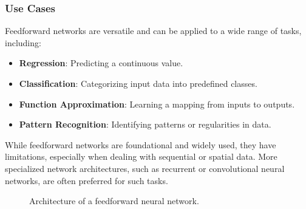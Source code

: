 \subsubsection{Use Cases}

Feedforward networks are versatile and can be applied to a wide range of tasks, including:
\begin{itemize}
    \item \textbf{Regression}: Predicting a continuous value.
    \item \textbf{Classification}: Categorizing input data into predefined classes.
    \item \textbf{Function Approximation}: Learning a mapping from inputs to outputs.
    \item \textbf{Pattern Recognition}: Identifying patterns or regularities in data.
\end{itemize}

While feedforward networks are foundational and widely used, they have limitations, especially when dealing with sequential or spatial data. More specialized network architectures, such as recurrent or convolutional neural networks, are often preferred for such tasks.



\begin{figure}[h]
\centering
{}
\caption{Architecture of a feedforward neural network.}
\end{figure}


